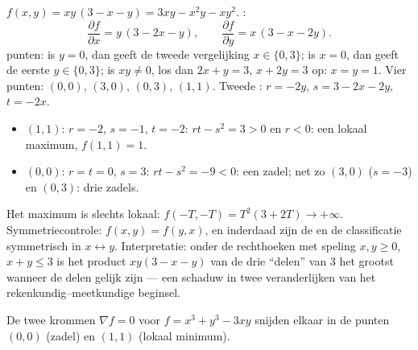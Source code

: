 \begin{example}
\label{ex:b1:multivar:fourpoints}
$f(x, y) = xy\,(3 - x - y) = 3xy - x^2y - xy^2$. :
\[
\frac{\partial f}{\partial x} = y\,(3 - 2x - y),
\qquad
\frac{\partial f}{\partial y} = x\,(3 - x - 2y).
\]
 punten: is $y = 0$, dan geeft de tweede vergelijking $x
\in \{0, 3\}$; is $x = 0$, dan geeft de eerste $y \in \{0, 3\}$; is
$xy \neq 0$, los dan $2x + y = 3$, $x + 2y = 3$ op: $x = y = 1$.
Vier punten: $(0,0)$, $(3,0)$, $(0,3)$, $(1,1)$. Tweede :
$r = -2y$, $s = 3 - 2x - 2y$, $t = -2x$.
\begin{itemize}
  \item $(1,1)$: $r = -2$, $s = -1$, $t = -2$: $rt - s^2 = 3 > 0$
        en $r < 0$: een lokaal maximum, $f(1,1) = 1$.
  \item $(0,0)$: $r = t = 0$, $s = 3$: $rt - s^2 = -9 < 0$: een
        zadel; net zo $(3, 0)$ ($s = -3$) en $(0, 3)$: drie
        zadels.
\end{itemize}
Het maximum is slechts lokaal: $f(-T, -T) = T^2(3 + 2T) \to
+\infty$. Symmetriecontrole: $f(x, y) = f(y, x)$, en inderdaad zijn
de   en de classificatie symmetrisch in $x
\leftrightarrow y$. Interpretatie: onder de rechthoeken met speling
$x, y \geq 0$, $x + y \leq 3$ is het product $xy(3 - x - y)$ van de
drie ``delen'' van $3$ het grootst wanneer de delen gelijk zijn ---
een schaduw in twee veranderlijken van het
rekenkundig--meetkundige beginsel.
\end{example}

\begin{omfigure}

{\small De twee krommen $\nabla f = 0$ voor $f = x^3 + y^3 - 3xy$
snijden elkaar in de  punten $(0,0)$ (zadel) en $(1,1)$
(lokaal minimum).}
\end{omfigure}


